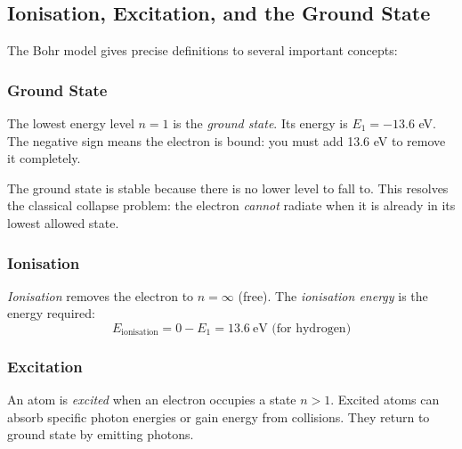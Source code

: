 \documentclass[12pt, a4paper]{book}
\newcommand{\newterm}[1]{\textit{\textcolor{DiscoveryColor}{#1}}}
\begin{document}
\subsection{Ionisation, Excitation, and the Ground State}

The Bohr model gives precise definitions to several
important concepts:

\subsubsection{Ground State}

The lowest energy level $n=1$ is the \newterm{ground state}.
Its energy is $E_1 = -13.6$ eV.
The negative sign means the electron is bound:
you must add 13.6 eV to remove it completely.

The ground state is stable because there is no lower
level to fall to.
This resolves the classical collapse problem:
the electron \emph{cannot} radiate when it is already
in its lowest allowed state.

\subsubsection{Ionisation}

\newterm{Ionisation} removes the electron to $n=\infty$ (free).
The \newterm{ionisation energy} is the energy required:
\[
  E_\text{ionisation} = 0 - E_1 = 13.6\ \text{eV (for hydrogen)}
\]

\subsubsection{Excitation}

An atom is \newterm{excited} when an electron occupies
a state $n > 1$.
Excited atoms can absorb specific photon energies or
gain energy from collisions.
They return to ground state by emitting photons.
\end{document}
